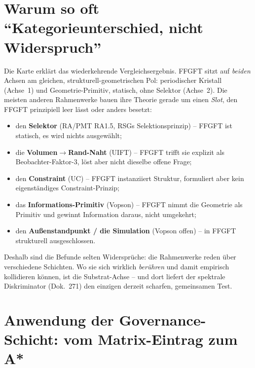 \section{Warum so oft \enquote{Kategorieunterschied, nicht Widerspruch}}

Die Karte erklärt das wiederkehrende Vergleichsergebnis. FFGFT sitzt auf \emph{beiden}
Achsen am gleichen, strukturell-geometrischen Pol: periodischer Kristall (Achse~1) und
Geometrie-Primitiv, statisch, ohne Selektor (Achse~2). Die meisten anderen Rahmenwerke
bauen ihre Theorie gerade um einen \emph{Slot}, den FFGFT prinzipiell leer lässt oder anders
besetzt:

\begin{itemize}
  \item den \textbf{Selektor} (RA/PMT RA1.5, RSGs Selektionsprinzip) -- FFGFT ist statisch,
        es wird nichts ausgewählt;
  \item die \textbf{Volumen$\to$Rand-Naht} (UIFT) -- FFGFT trifft sie explizit als
        Beobachter-Faktor-3, löst aber nicht dieselbe offene Frage;
  \item den \textbf{Constraint} (UC) -- FFGFT instanziiert Struktur, formuliert aber kein
        eigenständiges Constraint-Prinzip;
  \item das \textbf{Informations-Primitiv} (Vopson) -- FFGFT nimmt die Geometrie als Primitiv
        und gewinnt Information daraus, nicht umgekehrt;
  \item den \textbf{Außenstandpunkt / die Simulation} (Vopson offen) -- in FFGFT strukturell
        ausgeschlossen.
\end{itemize}

Deshalb sind die Befunde selten Widersprüche: die Rahmenwerke reden über verschiedene Schichten.
Wo sie sich wirklich \emph{berühren} und damit empirisch kollidieren können, ist die
Substrat-Achse -- und dort liefert der spektrale Diskriminator (Dok.~271) den einzigen
derzeit scharfen, gemeinsamen Test.

\section{Anwendung der Governance-Schicht: vom Matrix-Eintrag zum A*}


